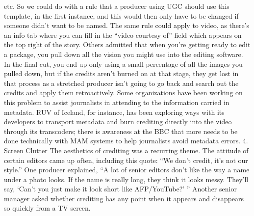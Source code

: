 \begin{enumerate}
etc. So we could do with a rule that a producer using UGC should
use this template, in the first instance, and this would then only have
to be changed if someone didn't want to be named. The same rule
could apply to video, as there's an info tab where you can fill in the
``video courtesy of'' field which appears on the top right of the story.
Others admitted that when you're getting ready to edit a package, you pull
down all the vision you might use into the editing software. In the final cut,
you end up only using a small percentage of all the images you pulled down,
but if the credits aren't burned on at that stage, they get lost in that process
as a stretched producer isn't going to go back and search out the credits and
apply them retroactively.
Some organizations have been working on this problem to assist journalists
in attending to the information carried in metadata. RUV of Iceland, for
instance, has been exploring ways with its developers to transport metadata
and burn crediting directly into the video through its transcoders; there is
awareness at the BBC that more needs to be done technically with MAM
systems to help journalists avoid metadata errors.
4. Screen Clutter
The aesthetics of crediting was a recurring theme. The attitude of certain
editors came up often, including this quote: ``We don't credit, it's not
our style.''
One producer explained, ``A lot of senior editors don't like the way a name
under a photo looks. If the name is really long, they think it looks messy.
They'll say, ‘Can't you just make it look short like AFP/YouTube?' ''
Another senior manager asked whether crediting has any point when it
appears and disappears so quickly from a TV screen.


\end{enumerate}
